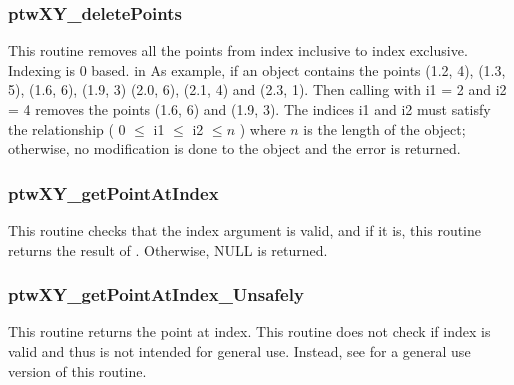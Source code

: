 \subsubsection{ptwXY\_deletePoints}
This routine removes all the points from index  inclusive to index  exclusive. Indexing is 0 based.
     in \noindent
As example, if an  object contains the points (1.2, 4), (1.3, 5), (1.6, 6), (1.9, 3) (2.0, 6), (2.1, 4) 
and (2.3, 1). Then calling  with i1 = 2 and i2 = 4 removes the points (1.6, 6) and (1.9, 3).
The indices i1 and i2 must satisfy the relationship ( 0 $\le$ i1 $\le$ i2 $\le n$ ) where $n$ is the length of the
 object; otherwise, no modification is done to the  object
and the error  is returned.

\subsubsection{ptwXY\_getPointAtIndex}
This routine checks that the index argument is valid, and if it is, this routine returns the result 
of . Otherwise, NULL is returned.

\subsubsection{ptwXY\_getPointAtIndex\_Unsafely}
This routine returns the point at index. This routine does not check if index is valid and 
thus is not intended for general use. Instead, see  for a general use version of this routine.

